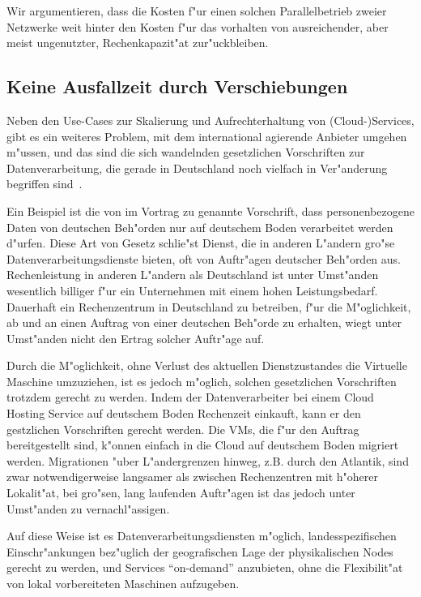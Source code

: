 \documentclass[draft,journal]{IEEEtran}
\begin{document}
Wir argumentieren, dass die Kosten f"ur einen solchen Parallelbetrieb
zweier Netzwerke weit hinter den Kosten f"ur das vorhalten von
ausreichender, aber meist ungenutzter, Rechenkapazit"at
zur"uckbleiben.

\subsection{Keine Ausfallzeit durch Verschiebungen}
\label{sec:keine-ausfallzeit}
Neben den Use-Cases zur Skalierung und Aufrechterhaltung von
(Cloud-)Services, gibt es ein weiteres Problem, mit dem international
agierende Anbieter umgehen m"ussen, und das sind die sich wandelnden
gesetzlichen Vorschriften zur Datenverarbeitung, die gerade in
Deutschland noch vielfach in Ver"anderung begriffen sind~\cite{none}.

Ein Beispiel ist die von \cite{MrBlah} im Vortrag zu \cite{foo}
genannte Vorschrift, dass personenbezogene Daten von deutschen
Beh"orden nur auf deutschem Boden verarbeitet werden d"urfen. Diese
Art von Gesetz schlie"st Dienst, die in anderen L"andern gro"se
Datenverarbeitungsdienste bieten, oft von Auftr"agen deutscher
Beh"orden aus. Rechenleistung in anderen L"andern als Deutschland ist
unter Umst"anden wesentlich billiger f"ur ein Unternehmen mit einem
hohen Leistungsbedarf. Dauerhaft ein Rechenzentrum in Deutschland zu
betreiben, f"ur die M"oglichkeit, ab und an einen Auftrag von einer
deutschen Beh"orde zu erhalten, wiegt unter Umst"anden nicht den
Ertrag solcher Auftr"age auf.

Durch die M"oglichkeit, ohne Verlust des aktuellen Dienstzustandes die
Virtuelle Maschine umzuziehen, ist es jedoch m"oglich, solchen
gesetzlichen Vorschriften trotzdem gerecht zu werden. Indem der
Datenverarbeiter bei einem Cloud Hosting Service auf deutschem Boden
Rechenzeit einkauft, kann er den gestzlichen Vorschriften gerecht
werden. Die VMs, die f"ur den Auftrag bereitgestellt sind, k"onnen
einfach in die Cloud auf deutschem Boden migriert werden. Migrationen
"uber L"andergrenzen hinweg, z.B. durch den Atlantik, sind zwar
notwendigerweise langsamer als zwischen Rechenzentren mit h"oherer
Lokalit"at, bei gro"sen, lang laufenden Auftr"agen ist das jedoch
unter Umst"anden zu vernachl"assigen. 

Auf diese Weise ist es Datenverarbeitungsdiensten m"oglich,
landesspezifischen Einschr"ankungen bez"uglich der geografischen Lage
der physikalischen Nodes gerecht zu werden, und Services "`on-demand"'
anzubieten, ohne die Flexibilit"at von lokal vorbereiteten Maschinen
aufzugeben.
\end{document}
